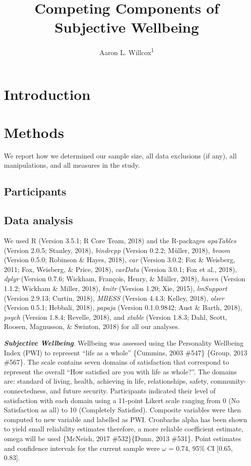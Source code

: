 \documentclass[man,floatsintext]{apa6}
\title{Competing Components of Subjective Wellbeing}
\author{Aaron L. Willcox\textsuperscript{1}}
\date{}
\affiliation{
\vspace{0.5cm}
\textsuperscript{1} Deakin University}
\begin{document}
\maketitle

\section{Introduction}\label{introduction}

\section{Methods}\label{methods}

We report how we determined our sample size, all data exclusions (if
any), all manipulations, and all measures in the study.

\subsection{Participants}\label{participants}

\subsection{Data analysis}\label{data-analysis}

We used R (Version 3.5.1; R Core Team, 2018) and the R-packages
\emph{apaTables} (Version 2.0.5; Stanley, 2018), \emph{bindrcpp}
(Version 0.2.2; Müller, 2018), \emph{broom} (Version 0.5.0; Robinson \&
Hayes, 2018), \emph{car} (Version 3.0.2; Fox \& Weisberg, 2011; Fox,
Weisberg, \& Price, 2018), \emph{carData} (Version 3.0.1; Fox et al.,
2018), \emph{dplyr} (Version 0.7.6; Wickham, François, Henry, \& Müller,
2018), \emph{haven} (Version 1.1.2; Wickham \& Miller, 2018),
\emph{knitr} (Version 1.20; Xie, 2015), \emph{lmSupport} (Version
2.9.13; Curtin, 2018), \emph{MBESS} (Version 4.4.3; Kelley, 2018),
\emph{olsrr} (Version 0.5.1; Hebbali, 2018), \emph{papaja} (Version
0.1.0.9842; Aust \& Barth, 2018), \emph{psych} (Version 1.8.4; Revelle,
2018), and \emph{xtable} (Version 1.8.3; Dahl, Scott, Roosen, Magnusson,
\& Swinton, 2018) for all our analyses.

\textbf{\emph{Subjective Wellbeing}}. Wellbeing was assessed using the
Personality Wellbeing Index (PWI) to represent \enquote{life as a whole}
\{Cummins, 2003 \#547\} \{Group, 2013 \#567\}. The scale contains seven
domains of satisfaction that correspond to represent the overall
\enquote{How satisfied are you with life as whole?}. The domains are:
standard of living, health, achieving in life, relationships, safety,
community-connectedness, and future security. Participants indicated
their level of satisfaction with each domain using a 11-point Likert
scale ranging from 0 (No Satisfaction as all) to 10 (Completely
Satisfied). Composite variables were then computed to new variable and
labelled as PWI. Cronbachs alpha has been shown to yield small
reliability estimates therefore, a more reliable coefficient estimate,
omega will be used \{McNeish, 2017 \#532\}\{Dunn, 2013 \#531\}. Point
estimates and confidence intervals for the current sample were
\(\omega\) = 0.74, 95\% CI {[}0.65, 0.83{]}.
\end{document}
